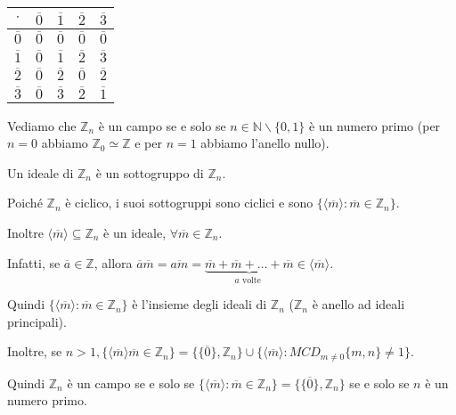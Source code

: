 \documentclass[../main.tex]{subfiles}
\begin{document}
\begin{example}
\begin{itemize}
              \begin{center}
                  \begin{tabular}{ c | c | c | c | c}
                      $\cdot$        & $\overline{0}$ & $\overline{1}$ & $\overline{2}$ & $\overline{3}$ \\ \hline
                      $\overline{0}$ & $\overline{0}$ & $\overline{0}$ & $\overline{0}$ & $\overline{0}$ \\ \hline
                      $\overline{1}$ & $\overline{0}$ & $\overline{1}$ & $\overline{2}$ & $\overline{3}$ \\ \hline
                      $\overline{2}$ & $\overline{0}$ & $\overline{2}$ & $\overline{0}$ & $\overline{2}$ \\ \hline
                      $\overline{3}$ & $\overline{0}$ & $\overline{3}$ & $\overline{2}$ & $\overline{1}$
                  \end{tabular}
              \end{center}
    \end{itemize}
\end{example}

Vediamo che $\mathbb{Z}_n$ è un campo se e solo se $n \in \mathbb{N} \backslash \{0,1\}$ è un numero primo (per $n =0 $ abbiamo $\mathbb{Z}_0 \simeq \mathbb{Z} $ e per $n = 1$ abbiamo l'anello nullo).

Un ideale di $\mathbb{Z}_n $ è un sottogruppo di $\mathbb{Z}_n$.

Poiché $\mathbb{Z}_n$ è ciclico, i suoi sottogruppi sono ciclici e sono $\{\langle \overline{m} \rangle : \overline{m} \in \mathbb{Z}_n\}$.

Inoltre $\langle \overline{m} \rangle \subseteq \mathbb{Z}_n$ è un ideale, $\forall \overline{m} \in \mathbb{Z}_n$.

Infatti, se $\overline{a} \in \mathbb{Z} $, allora $\overline{a} \overline{m} = \overline{am} = \underbrace{\overline{m} + \overline{m} + \ldots + \overline{m}}_{a \text{ volte }} \in \langle \overline{m} \rangle$.

Quindi $\{\langle \overline{m} \rangle : \overline{m} \in \mathbb{Z}_n\}$ è l'insieme
degli ideali di $\mathbb{Z}_n$ ($\mathbb{Z}_n$ è anello ad ideali principali).

Inoltre, se $n > 1, \{\langle \overline{m} \rangle \overline{m} \in \mathbb{Z}_n\} = \{\{\overline{0}\}, \mathbb{Z}_n\} \cup \{\langle \overline{m} \rangle : MCD_{m \neq 0} \{m,n\} \neq 1\}$.

Quindi $\mathbb{Z}_n$ è un campo se e solo se $\{\langle \overline{m} \rangle : \overline{m} \in \mathbb{Z}_n\} = \{\{\overline{0}\}, \mathbb{Z}_n\}$ se e solo se $n$ è un numero primo.
\end{document}
